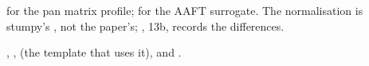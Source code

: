\citet{madrid2019matrix} for the pan matrix profile; \citet{theiler1992testing} for the AAFT
surrogate. The normalisation is stumpy's \citep{law2019stumpy}, not the paper's;
, 13b, records the differences.

, ,
 (the template that uses it), and
.
